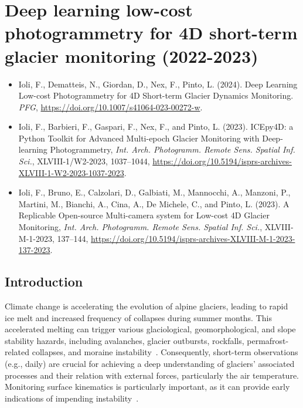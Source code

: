 \graphicspath{{figures/chapter4/}}
\onehalfspacing

\chapter{Deep learning low-cost photogrammetry for 4D short-term glacier monitoring
  (2022-2023)}\label{ch:4}



\begin{itemize}
  \item Ioli, F., Dematteis, N., Giordan, D., Nex, F., Pinto, L. (2024). Deep Learning Low-cost Photogrammetry for 4D Short-term Glacier Dynamics Monitoring. \textit{PFG}, \footnotesize{\url{https://doi.org/10.1007/s41064-023-00272-w}}.
  \item Ioli, F., Barbieri, F., Gaspari, F., Nex, F., and Pinto, L. (2023).
  ICEpy4D: a Python Toolkit for Advanced Multi-epoch Glacier Monitoring with Deep-learning Photogrammetry, \textit{Int. Arch. Photogramm. Remote Sens. Spatial Inf. Sci.}, XLVIII-1/W2-2023, 1037–1044, \footnotesize{\url{https://doi.org/10.5194/isprs-archives-XLVIII-1-W2-2023-1037-2023}}.
  \item Ioli, F., Bruno, E., Calzolari, D., Galbiati, M., Mannocchi, A., Manzoni, P., Martini, M., Bianchi, A., Cina, A., De Michele, C., and Pinto, L. (2023). A Replicable Open-source Multi-camera system for Low-cost 4D Glacier Monitoring, \textit{Int. Arch. Photogramm. Remote Sens. Spatial Inf. Sci.}, XLVIII-M-1-2023, 137–144, \footnotesize{\url{https://doi.org/10.5194/isprs-archives-XLVIII-M-1-2023-137-2023}}.
\end{itemize}

\newpage

\section{Introduction}\label{sec:4:intro}

Climate change is accelerating the evolution of alpine glaciers, leading to rapid ice melt and increased frequency of collapses during summer months. 
This accelerated melting can trigger various glaciological, geomorphological, and slope stability hazards, including avalanches, glacier outbursts, rockfalls, permafrost-related collapses, and moraine instability~\citep{Kaab2005, chiarle2023, Nigrelli2024}.
Consequently, short-term observations (e.g., daily) are crucial for achieving a deep understanding of glaciers' associated processes and their relation with external forces, particularly the air temperature.
Monitoring surface kinematics is particularly important, as it can provide early indications of impending instability~\citep{Faillettaz2015}.

